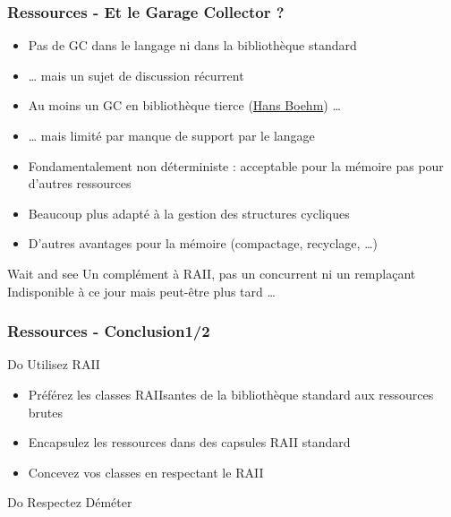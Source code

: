 \documentclass[C++.tex]{subfiles}
\begin{document}
\begin{frame}
	\frametitle{Ressources - Et le Garage Collector ?}
	\begin{itemize}
		\item Pas de GC dans le langage ni dans la bibliothèque standard
		\item \ldots{} mais un sujet de discussion récurrent


		\item Au moins un GC en bibliothèque tierce (\href{http://www.hboehm.info/gc/}{Hans Boehm}) \ldots
		\item \ldots{} mais limité par manque de support par le langage


		\item Fondamentalement non déterministe : acceptable pour la mémoire pas pour d'autres ressources


		\item Beaucoup plus adapté à la gestion des structures cycliques


		\item D'autres avantages pour la mémoire (compactage, recyclage, \ldots)
	\end{itemize}

	\begin{block}{Wait and see}
		Un complément à RAII, pas un concurrent ni un remplaçant\\
		Indisponible à ce jour mais peut-être plus tard \ldots
	\end{block}
\end{frame}

\begin{frame}
	\frametitle{Ressources - Conclusion\titlehfill{}1/2}
	\begin{exampleblock}{Do}
		Utilisez RAII
		\begin{itemize}
			\item Préférez les classes RAIIsantes de la bibliothèque standard aux ressources brutes
			\item Encapsulez les ressources dans des capsules RAII standard
			\item Concevez vos classes en respectant le RAII
		\end{itemize}
	\end{exampleblock}

	\begin{exampleblock}{Do}
		Respectez Déméter
	\end{exampleblock}
\end{frame}
\end{document}
